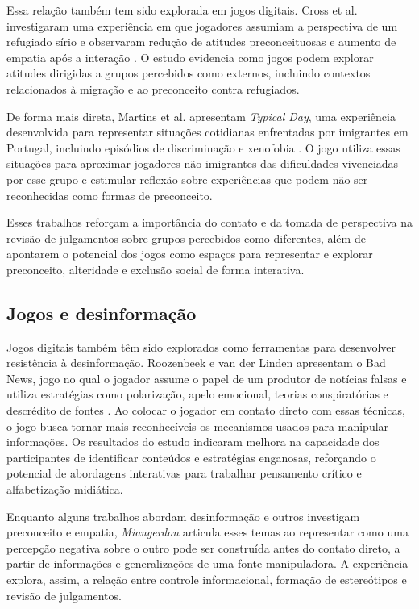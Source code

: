 \documentclass[12pt]{article}
\begin{document}
Essa relação também tem sido explorada em jogos digitais. Cross et al. investigaram uma experiência em que jogadores assumiam a perspectiva de um refugiado sírio e observaram redução de atitudes preconceituosas e aumento de empatia após a interação \cite{a_path_out}. O estudo evidencia como jogos podem explorar atitudes dirigidas a grupos percebidos como externos, incluindo contextos relacionados à migração e ao preconceito contra refugiados.

De forma mais direta, Martins et al. apresentam \textit{Typical Day}, uma experiência desenvolvida para representar situações cotidianas enfrentadas por imigrantes em Portugal, incluindo episódios de discriminação e xenofobia \cite{typicalday}. O jogo utiliza essas situações para aproximar jogadores não imigrantes das dificuldades vivenciadas por esse grupo e estimular reflexão sobre experiências que podem não ser reconhecidas como formas de preconceito.

Esses trabalhos reforçam a importância do contato e da tomada de perspectiva na revisão de julgamentos sobre grupos percebidos como diferentes, além de apontarem o potencial dos jogos como espaços para representar e explorar preconceito, alteridade e exclusão social de forma interativa.

\subsection{Jogos e desinformação}
Jogos digitais também têm sido explorados como ferramentas para desenvolver resistência à desinformação. Roozenbeek e van der Linden apresentam o Bad News, jogo no qual o jogador assume o papel de um produtor de notícias falsas e utiliza estratégias como polarização, apelo emocional, teorias conspiratórias e descrédito de fontes \cite{bad_news}. Ao colocar o jogador em contato direto com essas técnicas, o jogo busca tornar mais reconhecíveis os mecanismos usados para manipular informações. Os resultados do estudo indicaram melhora na capacidade dos participantes de identificar conteúdos e estratégias enganosas, reforçando o potencial de abordagens interativas para trabalhar pensamento crítico e alfabetização midiática.

Enquanto alguns trabalhos abordam desinformação e outros investigam preconceito e empatia, \textit{Miaugerdon} articula esses temas ao representar como uma percepção negativa sobre o outro pode ser construída antes do contato direto, a partir de informações e generalizações de uma fonte manipuladora. A experiência explora, assim, a relação entre controle informacional, formação de estereótipos e revisão de julgamentos.
\end{document}
